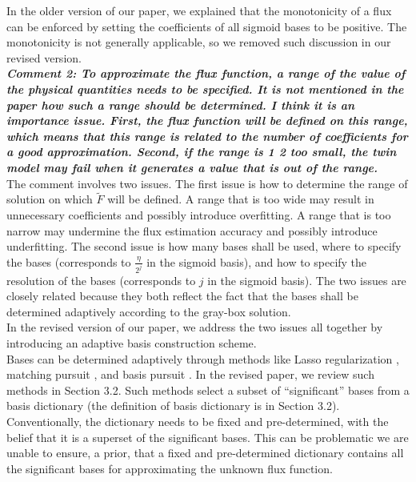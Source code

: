 \documentclass[a4paper,twoside]{article}
\begin{document}
In the older version of our paper, we explained that the monotonicity of a flux can be enforced
by setting the coefficients of all sigmoid bases to be positive. The monotonicity is 
not generally applicable, so we removed such discussion in our revised version.\\

\emph{\textbf{Comment 2:
To approximate the flux function, a range of the value of the physical quantities needs to be specified. It is not mentioned in the paper how such a range should be determined. I think it is an importance issue. First, the flux function will be defined on this range, which means that this range is related to the number of coefficients for a good approximation. Second, if the range is 1 2 too small, the twin model may fail when it generates a value that is out of the range.}}\\

The comment involves two issues. The first issue is how to determine the range of solution
on which $\tilde{F}$ will be defined. A range that is too wide may result in unnecessary 
coefficients and possibly introduce overfitting. 
A range that is too narrow may undermine the flux estimation
accuracy and possibly introduce underfitting.
The second issue is how many bases shall be used, where to specify the bases
(corresponds to $\frac{\eta}{2^j}$ in the sigmoid basis),
and how to specify the resolution of the bases (corresponds to $j$ in the sigmoid basis).
The two issues are closely related because they both reflect the fact that
the bases shall be determined adaptively according to the gray-box solution.\\

In the revised version of our paper, we address the two issues all together by introducing
an adaptive basis construction scheme.\\

Bases can be determined adaptively through methods like Lasso regularization 
\cite{Lasso variable selection},
matching pursuit \cite{match pursuit}, and basis pursuit \cite{L1 basis pursuit}. 
In the revised paper, we review such methods in Section 
3.2. Such methods select a subset of ``significant'' bases from a basis dictionary (the 
definition of basis dictionary is in Section 3.2). 
Conventionally, the dictionary needs to be fixed and pre-determined, with the belief that it is a 
superset of the significant bases.
This can be problematic we are unable to ensure, a prior, that a fixed and pre-determined dictionary 
contains all the significant bases for approximating the unknown flux function.\\
\end{document}

